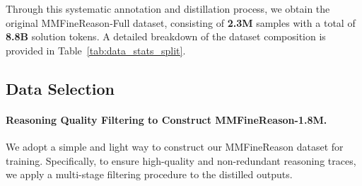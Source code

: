 



Through this systematic annotation and distillation process, we obtain the original MMFineReason-Full dataset, consisting of \textbf{2.3M} samples with a total of \textbf{8.8B} solution tokens. 
A detailed breakdown of the dataset composition is provided in Table~\ref{tab:data_stats_split}.



\subsection{Data Selection}\label{subsec:dataselect}



\paragraph{Reasoning Quality Filtering to Construct MMFineReason-1.8M.}
We adopt a simple and light way to construct our MMFineReason dataset for training. Specifically, to ensure high-quality and non-redundant reasoning traces, we apply a multi-stage filtering procedure to the distilled outputs.

